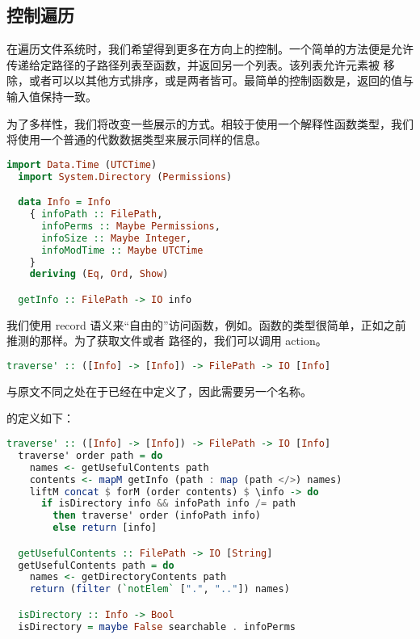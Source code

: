\documentclass[./main.tex]{subfiles}
\begin{document}
\subsection*{控制遍历}

在遍历文件系统时，我们希望得到更多在方向上的控制。一个简单的方法便是允许传递给定路径的子路径列表至函数，并返回另一个列表。该列表允许元素被
移除，或者可以以其他方式排序，或是两者皆可。最简单的控制函数是，返回的值与输入值保持一致。

为了多样性，我们将改变一些展示的方式。相较于使用一个解释性函数类型，我们将使用一个普通的代数数据类型来展示同样的信息。

\begin{lstlisting}[language=Haskell]
  import Data.Time (UTCTime)
  import System.Directory (Permissions)

  data Info = Info
    { infoPath :: FilePath,
      infoPerms :: Maybe Permissions,
      infoSize :: Maybe Integer,
      infoModTime :: Maybe UTCTime
    }
    deriving (Eq, Ord, Show)

  getInfo :: FilePath -> IO info
\end{lstlisting}

我们使用 record 语义来“自由的”访问函数，例如。函数的类型很简单，正如之前推测的那样。为了获取文件或者
路径的，我们可以调用 action。

\begin{lstlisting}[language=Haskell]
  traverse' :: ([Info] -> [Info]) -> FilePath -> IO [Info]
\end{lstlisting}

与原文不同之处在于已经在中定义了，因此需要另一个名称。

的定义如下：

\begin{lstlisting}[language=Haskell]
  traverse' :: ([Info] -> [Info]) -> FilePath -> IO [Info]
  traverse' order path = do
    names <- getUsefulContents path
    contents <- mapM getInfo (path : map (path </>) names)
    liftM concat $ forM (order contents) $ \info -> do
      if isDirectory info && infoPath info /= path
        then traverse' order (infoPath info)
        else return [info]

  getUsefulContents :: FilePath -> IO [String]
  getUsefulContents path = do
    names <- getDirectoryContents path
    return (filter (`notElem` [".", ".."]) names)

  isDirectory :: Info -> Bool
  isDirectory = maybe False searchable . infoPerms
\end{lstlisting}
\end{document}
